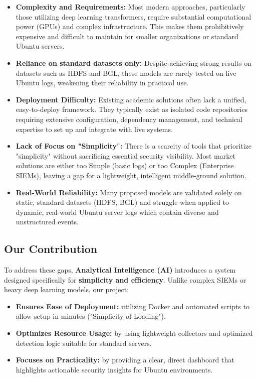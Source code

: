 \documentclass[12pt,a4paper]{report} %
\begin{document}
\begin{itemize}
    \item \textbf{Complexity and Requirements:} Most modern approaches, particularly those utilizing deep learning transformers, require substantial computational power (GPUs) and complex infrastructure. This makes them prohibitively expensive and difficult to maintain for smaller organizations or standard Ubuntu servers.
    
    \item \textbf{Reliance on standard datasets only:} Despite achieving strong results on datasets such as HDFS and BGL, these models are rarely tested on live Ubuntu logs, weakening their reliability in practical use.

    \item \textbf{Deployment Difficulty:} Existing academic solutions often lack a unified, easy-to-deploy framework. They typically exist as isolated code repositories requiring extensive configuration, dependency management, and technical expertise to set up and integrate with live systems.
    
    \item \textbf{Lack of Focus on "Simplicity":} There is a scarcity of tools that prioritize "simplicity" without sacrificing essential security visibility. Most market solutions are either too Simple (basic logs) or too Complex (Enterprise SIEMs), leaving a gap for a lightweight, intelligent middle-ground solution.
    
    \item \textbf{Real-World Reliability:} Many proposed models are validated solely on static, standard datasets (HDFS, BGL) and struggle when applied to dynamic, real-world Ubuntu server logs which contain diverse and unstructured events.
\end{itemize}

\subsection{Our Contribution}
To address these gaps, \textbf{Analytical Intelligence (AI)} introduces a system designed specifically for \textbf{simplicity and efficiency}. Unlike complex SIEMs or heavy deep learning models, our project:
\begin{itemize}
    \item \textbf{Ensures Ease of Deployment:} utilizing Docker and automated scripts to allow setup in minutes ("Simplicity of Loading").
    \item \textbf{Optimizes Resource Usage:} by using lightweight collectors and optimized detection logic suitable for standard servers.
    \item \textbf{Focuses on Practicality:} by providing a clear, direct dashboard that highlights actionable security insights for Ubuntu environments.
\end{itemize}
\end{document}
